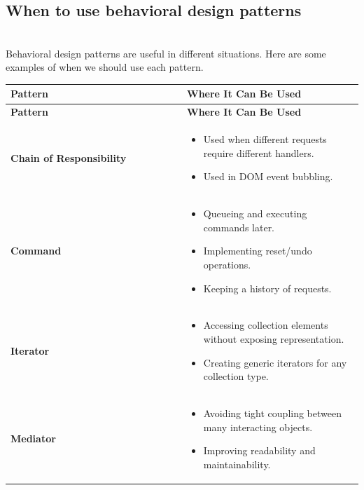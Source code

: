 \subsection{When to use behavioral design patterns}\label{jQ3HidXyU1Od_fDPohYg_}
\\
Behavioral design patterns are useful in different situations. Here are some examples of when we should use each pattern.
{\def\LTcaptype{none}
\begin{longtable}{%
>{\centering\arraybackslash}p{0.5\linewidth}%
>{\centering\arraybackslash}p{0.5\linewidth}%
}
\toprule
\textbf{Pattern} & \textbf{Where It Can Be Used} \\
\midrule
\endfirsthead

\toprule
\textbf{Pattern} & \textbf{Where It Can Be Used} \\
\midrule
\endhead

\bottomrule
\endlastfoot

\textbf{Chain of Responsibility} &
\begin{itemize}
    \item Used when different requests require different handlers.
    \item Used in DOM event bubbling.
\end{itemize}
\\

\textbf{Command} &
\begin{itemize}
    \item Queueing and executing commands later.
    \item Implementing reset/undo operations.
    \item Keeping a history of requests.
\end{itemize}
\\

\textbf{Iterator} &
\begin{itemize}
    \item Accessing collection elements without exposing representation.
    \item Creating generic iterators for any collection type.
\end{itemize}
\\

\textbf{Mediator} &
\begin{itemize}
    \item Avoiding tight coupling between many interacting objects.
    \item Improving readability and maintainability.
\end{itemize}
\\


\end{longtable}}
